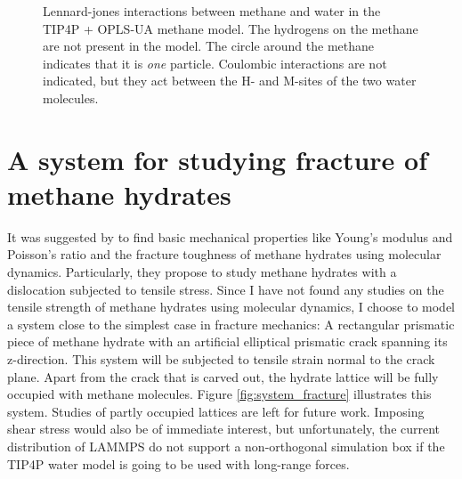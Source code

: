 \begin{figure}
\centering
{}
\caption{Lennard-jones interactions between methane and water in the TIP4P + OPLS-UA methane model. The hydrogens on the methane are not present in the model. The circle around the methane indicates that it is \emph{one} particle. Coulombic interactions are not indicated, but they act between the H- and M-sites of the two water molecules.}
\label{fig:tip4p_ice_uam}
\end{figure}


\section{A system for studying fracture of methane hydrates}
It was suggested by \citet{Ning2012} to find basic mechanical properties like Young's modulus and Poisson's ratio and the fracture toughness of methane hydrates using molecular dynamics. Particularly, they propose to study methane hydrates with a dislocation subjected to tensile stress. Since I have not found any studies on the tensile strength of methane hydrates using molecular dynamics, I choose to model a system close to the simplest case in fracture mechanics: A rectangular prismatic piece of methane hydrate with an artificial elliptical prismatic crack spanning its z-direction. This system will be subjected to tensile strain normal to the crack plane. Apart from the crack that is carved out, the hydrate lattice will be fully occupied with methane molecules. Figure \ref{fig:system_fracture} illustrates this system. Studies of partly occupied lattices are left for future work. Imposing shear stress would also be of immediate interest, but unfortunately, the current distribution of LAMMPS do not support a non-orthogonal simulation box if the TIP4P water model is going to be used with long-range forces.

